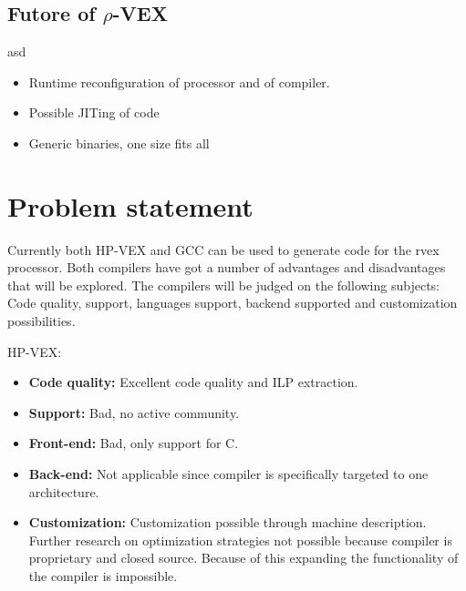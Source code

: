 \subsection{Futore of $\rho$-VEX}
asd
\begin{itemize}
	\item Runtime reconfiguration of processor and of compiler.
	\item Possible JITing of code
	\item Generic binaries, one size fits all
\end{itemize}

\section{Problem statement}
Currently both HP-VEX and GCC can be used to generate code for the rvex processor. Both compilers have got a number of advantages and disadvantages that will be explored. The compilers will be judged on the following subjects: Code quality, support, languages support, backend supported and customization possibilities.

HP-VEX:
\begin{itemize}
	\item \textbf{Code quality:} Excellent code quality and ILP extraction.
	\item \textbf{Support:} Bad, no active community.
	\item \textbf{Front-end:} Bad, only support for C.
	\item \textbf{Back-end:} Not applicable since compiler is specifically targeted to one architecture.
	\item \textbf{Customization:} Customization possible through machine description. Further research on optimization strategies not possible because compiler is proprietary and closed source. Because of this expanding the functionality of the compiler is impossible.
\end{itemize}

